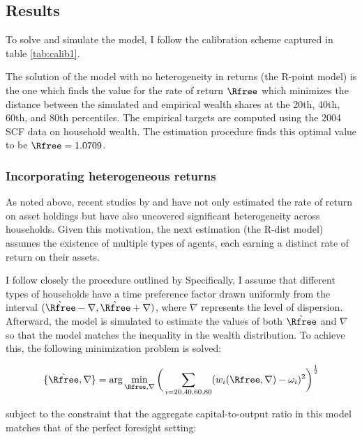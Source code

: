 \documentclass[\econtexRoot/Chp1proposal]{subfiles}
\begin{document}
\subsection{Results}
\par To solve and simulate the model, I follow the calibration scheme captured in table \ref{tab:calib1}.
\unskip

\par The solution of the model with no heterogeneity in returns (the R-point model) is the one which finds the value for the rate of return $\Rfree$ which minimizes the distance between the simulated and empirical wealth shares at the 20th, 40th, 60th, and 80th percentiles. The empirical targets are computed using the 2004 SCF data on household wealth. The estimation procedure finds this optimal value to be $\Rfree = 1.0709$.

\subsubsection{Incorporating heterogeneous returns}

\par As noted above, recent studies by \cite{aflgdmlp20} and \cite{lblcps18} have not only estimated the rate of return on asset holdings but have also uncovered significant heterogeneity across households. Given this motivation, the next estimation (the R-dist model) assumes the existence of multiple types of agents, each earning a distinct rate of return on their assets.

\par I follow closely the procedure outlined by \cite{cstw2017} Specifically, I assume that different types of households have a time preference factor drawn uniformly from the interval $(\grave{\Rfree} - \nabla, \grave{\Rfree} + \nabla)$, where $\nabla$ represents the level of dispersion. Afterward, the model is simulated to estimate the values of both $\grave{\Rfree}$ and $\nabla$ so that the model matches the inequality in the wealth distribution. To achieve this, the following minimization problem is solved:

$$ \{\grave{\Rfree}, \nabla\} = \text{arg}\min_{\Rfree, \nabla} \bigg( \sum_{i=20, 40, 60, 80} (w_{i}(\Rfree, \nabla)-\omega_i )^{2} \bigg)^{\frac{1}{2}} $$

\par subject to the constraint that the aggregate capital-to-output ratio in this model matches that of the perfect foresight setting:
\end{document}
